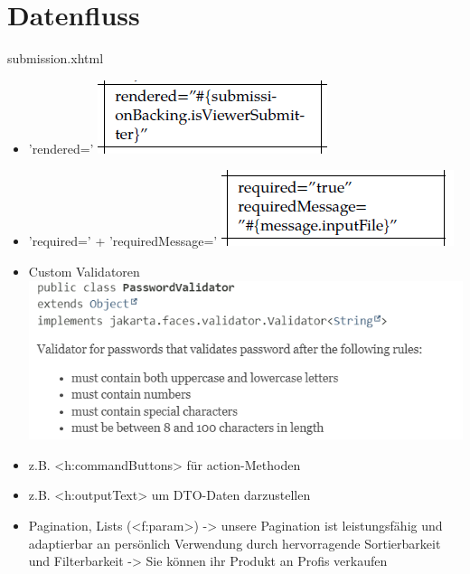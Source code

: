 \documentclass{beamer}
\begin{document}
    \section{Datenfluss}
    \begin{frame}{submission.xhtml}
        \begin{itemize}
            \item 'rendered='
            \centering
            \includegraphics[height=1.1\textheight]{graphics/facelet/fac_rendered}

            \item 'required=' + 'requiredMessage='
            \centering
            \includegraphics[height=1.1\textheight]{graphics/facelet/fac_required}
            \item Custom Validatoren
            \centering
            \includegraphics[height=1.1\textheight]{graphics/facelet/doc_validator}

            \item z.B. <h:commandButtons> für action-Methoden %
            \item z.B. <h:outputText> um DTO-Daten darzustellen %
            \item Pagination, Lists (<f:param>) %
            -> unsere Pagination ist leistungsfähig und adaptierbar an persönlich Verwendung
            durch hervorragende Sortierbarkeit und Filterbarkeit
            -> Sie können ihr Produkt an Profis verkaufen


\end{itemize}
\end{frame}
\end{document}
